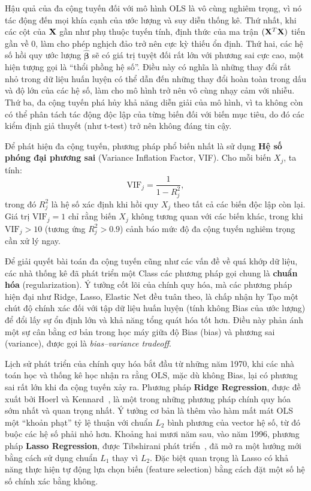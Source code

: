 Hậu quả của đa cộng tuyến đối với mô hình OLS là vô cùng nghiêm trọng, vì nó tác động đến mọi khía cạnh của ước lượng và suy diễn thống kê. Thứ nhất, khi các cột của $\mathbf{X}$ gần như phụ thuộc tuyến tính, định thức của ma trận $(\mathbf{X}^T\mathbf{X})$ tiến gần về 0, làm cho phép nghịch đảo trở nên cực kỳ thiếu ổn định. Thứ hai, các hệ số hồi quy ước lượng $\hat{\boldsymbol{\beta}}$ sẽ có giá trị tuyệt đối rất lớn với phương sai cực cao, một hiện tượng gọi là ``thổi phồng hệ số''. Điều này có nghĩa là những thay đổi rất nhỏ trong dữ liệu huấn luyện có thể dẫn đến những thay đổi hoàn toàn trong dấu và độ lớn của các hệ số, làm cho mô hình trở nên vô cùng nhạy cảm với nhiễu. Thứ ba, đa cộng tuyến phá hủy khả năng diễn giải của mô hình, vì ta không còn có thể phân tách tác động độc lập của từng biến đối với biến mục tiêu, do đó các kiểm định giả thuyết (như t-test) trở nên không đáng tin cậy.

\begin{note}
Để phát hiện đa cộng tuyến, phương pháp phổ biến nhất là sử dụng \textbf{Hệ số phóng đại phương sai} (Variance Inflation Factor, VIF). Cho mỗi biến $X_j$, ta tính:
\begin{equation}
    \mathrm{VIF}_j = \frac{1}{1 - R_j^2},
\end{equation}
trong đó $R_j^2$ là hệ số xác định khi hồi quy $X_j$ theo tất cả các biến độc lập còn lại. Giá trị $\mathrm{VIF}_j = 1$ chỉ rằng biến $X_j$ không tương quan với các biến khác, trong khi $\mathrm{VIF}_j > 10$ (tương ứng $R_j^2 > 0.9$) cảnh báo mức độ đa cộng tuyến nghiêm trọng cần xử lý ngay.
\end{note}


Để giải quyết bài toán đa cộng tuyến cũng như các vấn đề về quá khớp dữ liệu, các nhà thống kê đã phát triển một Class các phương pháp gọi chung là \textbf{chuẩn hóa} (regularization). Ý tưởng cốt lõi của chính quy hóa, mà các phương pháp hiện đại như Ridge, Lasso, Elastic Net đều tuân theo, là chấp nhận hy Tạo một chút độ chính xác đối với tập dữ liệu huấn luyện (tính không Bias của ước lượng) để đổi lấy sự ổn định lớn và khả năng tổng quát hóa tốt hơn. Điều này phản ánh một sự cân bằng cơ bản trong học máy giữa độ Bias (bias) và phương sai (variance), được gọi là \textit{bias--variance tradeoff}.

Lịch sử phát triển của chính quy hóa bắt đầu từ những năm 1970, khi các nhà toán học và thống kê học nhận ra rằng OLS, mặc dù không Bias, lại có phương sai rất lớn khi đa cộng tuyến xảy ra. Phương pháp \textbf{Ridge Regression}, được đề xuất bởi Hoerl và Kennard~\cite{hoerl1970}, là một trong những phương pháp chính quy hóa sớm nhất và quan trọng nhất. Ý tưởng cơ bản là thêm vào hàm mất mát OLS một ``khoản phạt'' tỷ lệ thuận với chuẩn $L_2$ bình phương của vector hệ số, từ đó buộc các hệ số phải nhỏ hơn. Khoảng hai mươi năm sau, vào năm 1996, phương pháp \textbf{Lasso Regression}, được Tibshirani phát triển~\cite{tibshirani1996}, đã mở ra một hướng mới bằng cách sử dụng chuẩn $L_1$ thay vì $L_2$. Đặc biệt quan trọng là Lasso có khả năng thực hiện tự động lựa chọn biến (feature selection) bằng cách đặt một số hệ số chính xác bằng không.

